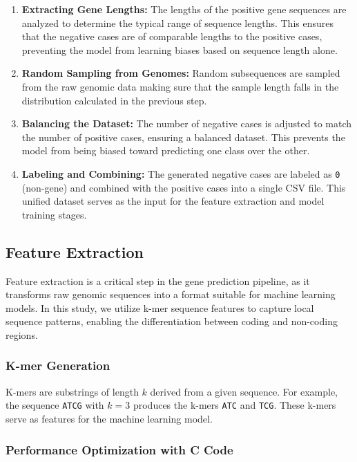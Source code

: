 \documentclass[
	a4paper, %
	10pt, %
	unnumberedsections, %
	twoside, %
]{LTJournalArticle}
\begin{document}
\begin{enumerate}
    \item \textbf{Extracting Gene Lengths:} The lengths of the positive gene sequences are analyzed to determine the typical range of sequence lengths. This ensures that the negative cases are of comparable lengths to the positive cases, preventing the model from learning biases based on sequence length alone.
    \item \textbf{Random Sampling from Genomes:} Random subsequences are sampled from the raw genomic data making sure that the sample length falls in the distribution calculated in the previous step. 
    \item \textbf{Balancing the Dataset:} The number of negative cases is adjusted to match the number of positive cases, ensuring a balanced dataset. This prevents the model from being biased toward predicting one class over the other.
    \item \textbf{Labeling and Combining:} The generated negative cases are labeled as \texttt{0} (non-gene) and combined with the positive cases into a single CSV file. This unified dataset serves as the input for the feature extraction and model training stages.
\end{enumerate}

\subsection{Feature Extraction}

Feature extraction is a critical step in the gene prediction pipeline, as it transforms raw genomic sequences into a format suitable for machine learning models. In this study, we utilize k-mer sequence features to capture local sequence patterns, enabling the differentiation between coding and non-coding regions.

\subsubsection{K-mer Generation}

K-mers are substrings of length \(k\) derived from a given sequence. For example, the sequence \texttt{ATCG} with \(k=3\) produces the k-mers \texttt{ATC} and \texttt{TCG}. These k-mers serve as features for the machine learning model.

\subsubsection{Performance Optimization with C Code}
\end{document}
